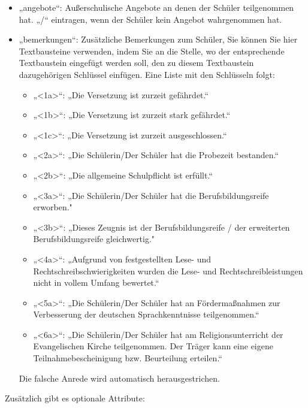 \documentclass[a4paper,10pt]{scrartcl}
\begin{document}
\begin{itemize}
         \item „angebote“: Außerschulische Angebote an denen der Schüler teilgenommen hat. „/“ eintragen, wenn der Schüler kein Angebot wahrgenommen hat.
         \item „bemerkungen“: Zusätzliche Bemerkungen zum Schüler, \newline
	 Sie können Sie hier Textbausteine verwenden, indem Sie an die Stelle, wo der entsprechende Textbaustein eingefügt werden soll, den zu diesem Textbaustein dazugehörigen Schlüssel einfügen. Eine Liste mit den Schlüsseln folgt:
	 \begin{itemize}
	    \item „<1a>“: „Die Versetzung ist zurzeit gefährdet.“
            \item „<1b>“: „Die Versetzung ist zurzeit stark gefährdet.“
            \item „<1c>“: „Die Versetzung ist zurzeit ausgeschlossen.“
            \newline            
	    \item „<2a>“: „Die Schülerin/Der Schüler hat die Probezeit bestanden.“
            \item „<2b>“: „Die allgemeine Schulpflicht ist erfüllt.“
            \newline
	    \item „<3a>“: „Die Schülerin/Der Schüler hat die Berufsbildungsreife erworben."
	    \item „<3b>“: „Dieses Zeugnis ist der Berufsbildungsreife / der erweiterten Berufsbildungsreife gleichwertig."
            \newline
	    \item „<4a>“: „Aufgrund von festgestellten Lese- und Rechtschreibschwierigkeiten wurden die Lese- und Rechtschreibleistungen nicht in vollem Umfang bewertet.“
	    \newline
            \item „<5a>“: „Die Schülerin/Der Schüler hat an Fördermaßnahmen zur Verbesserung der deutschen Sprachkenntnisse teilgenommen.“
            \newline
            \item „<6a>“: „Die Schülerin/Der Schüler hat am Religionsunterricht der Evangelischen Kirche teilgenommen. Der Träger kann eine eigene Teilnahmebescheinigung bzw. Beurteilung erteilen.“
         \end{itemize}
	 Die falsche Anrede wird automatisch herausgestrichen.
      \end{itemize}
      Zusätzlich gibt es optionale Attribute:
\end{document}
